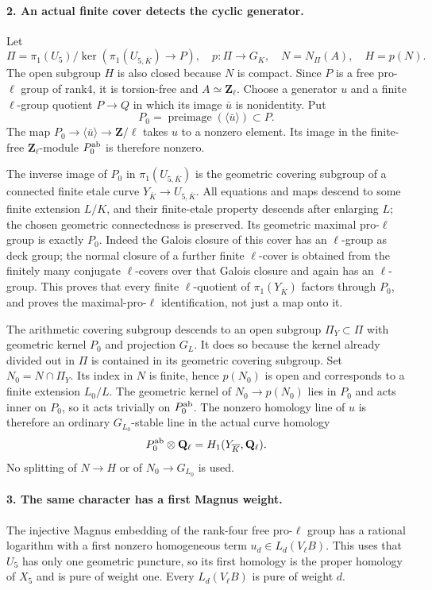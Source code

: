 \paragraph{2. An actual finite cover detects the cyclic generator.}
Let
\[
 \Pi=\pi_1(U_5)/\ker(\pi_1(U_{5,\overline K})\to P),
 \quad p:\Pi\to G_K,\quad N=N_\Pi(A),\quad H=p(N).
\]
The open subgroup $H$ is also closed because $N$ is compact.
Since $P$ is a free pro-$\ell$ group of rank4, it is torsion-free
and $A\simeq\mathbf Z_\ell$. Choose a generator $u$ and a finite
$\ell$-group quotient $P\to Q$ in which its image $\bar u$ is
nonidentity. Put
\[
 P_0=\operatorname{preimage}(\langle\bar u\rangle)\subset P.
\]
The map $P_0\to\langle\bar u\rangle\to\mathbf Z/\ell$ takes
$u$ to a nonzero element. Its image in the finite-free
$\mathbf Z_\ell$-module $P_0^{\rm ab}$ is therefore nonzero.

The inverse image of $P_0$ in $\pi_1(U_{5,\overline K})$ is the
geometric covering subgroup of a connected finite etale curve
$Y_{\overline K}\to U_{5,\overline K}$. All equations and maps
descend to some finite extension $L/K$, and their finite-etale
property descends after enlarging $L$; the chosen geometric
connectedness is preserved. Its geometric maximal pro-$\ell$
group is exactly $P_0$. Indeed the Galois closure of this cover
has an $\ell$-group as deck group; the normal closure of a further
finite $\ell$-cover is obtained from the finitely many conjugate
$\ell$-covers over that Galois closure and again has an
$\ell$-group. This proves that every finite $\ell$-quotient of
$\pi_1(Y_{\overline K})$ factors through $P_0$, and proves the
maximal-pro-$\ell$ identification, not just a map onto it.

The arithmetic covering subgroup descends to an open subgroup
$\Pi_Y\subset\Pi$ with geometric kernel $P_0$ and projection
$G_L$. It does so because the kernel already divided out in
$\Pi$ is contained in its geometric covering subgroup. Set
$N_0=N\cap\Pi_Y$. Its index in $N$ is finite, hence
$p(N_0)$ is open and corresponds to a finite extension $L_0/L$.
The geometric kernel of $N_0\to p(N_0)$ lies in $P_0$ and acts
inner on $P_0$, so it acts trivially on $P_0^{\rm ab}$.
The nonzero homology line of $u$ is therefore an ordinary
$G_{L_0}$-stable line in the actual curve homology
\[
 P_0^{\rm ab}\otimes\mathbf Q_\ell
 =H_1(Y_{\overline K},\mathbf Q_\ell).
\]
No splitting of $N\to H$ or of $N_0\to G_{L_0}$ is used.

\paragraph{3. The same character has a first Magnus weight.}
The injective Magnus embedding of the rank-four free pro-$\ell$
group has a rational logarithm with a first nonzero homogeneous
term $u_d\in L_d(V_\ell B)$. This uses that $U_5$ has only one
geometric puncture, so its first homology is the proper homology
of $X_5$ and is pure of weight one. Every $L_d(V_\ell B)$ is
pure of weight $d$.

